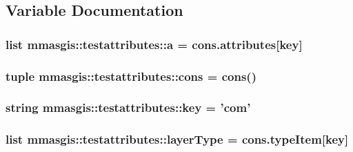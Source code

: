 \subsection{Variable Documentation}
\hypertarget{namespacemmasgis_1_1testattributes_a5ae835ee85a1bbc00089eb0aec6a8dd0}{
\subsubsection[{a}]{\setlength{\rightskip}{0pt plus 5cm}list {\bf mmasgis::testattributes::a} = cons.attributes\mbox{[}{\bf key}\mbox{]}}}
\label{namespacemmasgis_1_1testattributes_a5ae835ee85a1bbc00089eb0aec6a8dd0}
\hypertarget{namespacemmasgis_1_1testattributes_a0b652b001f6d0dc54cd2b6f1aa8b428f}{
\subsubsection[{cons}]{\setlength{\rightskip}{0pt plus 5cm}tuple {\bf mmasgis::testattributes::cons} = {\bf cons}()}}
\label{namespacemmasgis_1_1testattributes_a0b652b001f6d0dc54cd2b6f1aa8b428f}
\hypertarget{namespacemmasgis_1_1testattributes_abe81a3de23b800415a93ab3e50139db2}{
\subsubsection[{key}]{\setlength{\rightskip}{0pt plus 5cm}string {\bf mmasgis::testattributes::key} = 'com'}}
\label{namespacemmasgis_1_1testattributes_abe81a3de23b800415a93ab3e50139db2}
\hypertarget{namespacemmasgis_1_1testattributes_a13c6d65931cdb3acb370a33f768f7854}{
\subsubsection[{layerType}]{\setlength{\rightskip}{0pt plus 5cm}list {\bf mmasgis::testattributes::layerType} = {\bf cons.typeItem}\mbox{[}{\bf key}\mbox{]}}}
\label{namespacemmasgis_1_1testattributes_a13c6d65931cdb3acb370a33f768f7854}
